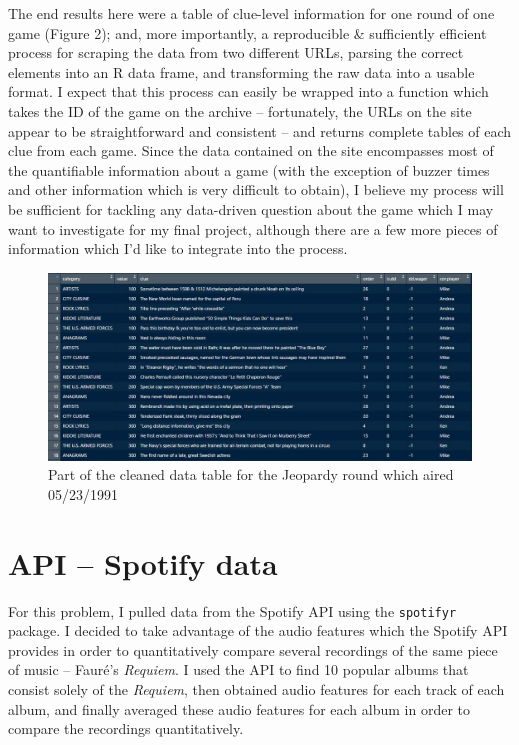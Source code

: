 \documentclass{article}
\begin{document}
The end results here were a table of clue-level information for one round of one game (Figure 2); and, more importantly, a reproducible \& sufficiently efficient process for scraping the data from two different URLs, parsing the correct elements into an R data frame, and transforming the raw data into a usable format. I expect that this process can easily be wrapped into a function which takes the ID of the game on the archive -- fortunately, the URLs on the site appear to be straightforward and consistent -- and returns complete tables of each clue from each game. Since the data contained on the site encompasses most of the quantifiable information about a game (with the exception of buzzer times and other information which is very difficult to obtain), I believe my process will be sufficient for tackling any data-driven question about the game which I may want to investigate for my final project, although there are a few more pieces of information which I'd like to integrate into the process.

\begin{figure}[t]
	\centering
	\includegraphics[width=\textwidth]{screenshot_clean.jpg}
	\caption{Part of the cleaned data table for the Jeopardy round which aired 05/23/1991}
\end{figure}

\section{API -- Spotify data}

For this problem, I pulled data from the Spotify API using the \texttt{spotifyr} package. I decided to take advantage of the audio features which the Spotify API provides in order to quantitatively compare several recordings of the same piece of music -- Faur\'e's \textit{Requiem}. I used the API to find 10 popular albums that consist solely of the \textit{Requiem}, then obtained audio features for each track of each album, and finally averaged these audio features for each album in order to compare the recordings quantitatively.
\end{document}
